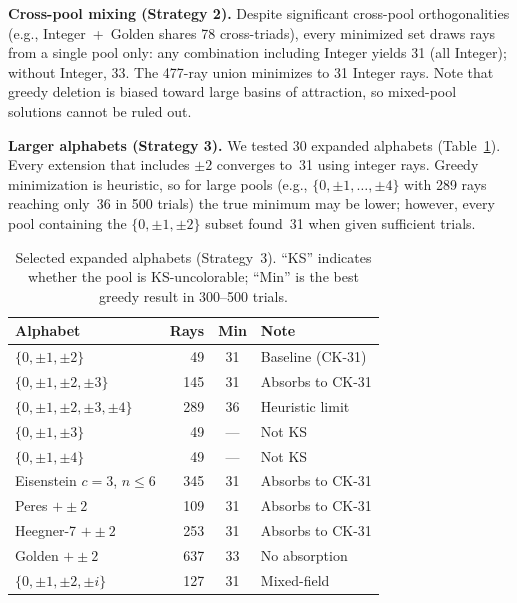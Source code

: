 \documentclass[twocolumn,prl,superscriptaddress,nofootinbib]{revtex4-2}
\begin{document}
\textbf{Cross-pool mixing (Strategy 2).} Despite significant cross-pool orthogonalities (e.g., Integer~+~Golden shares 78 cross-triads), every minimized set draws rays from a single pool only: any combination including Integer yields 31 (all Integer); without Integer, 33.  The 477-ray union minimizes to 31 Integer rays.  Note that greedy deletion is biased toward large basins of attraction, so mixed-pool solutions cannot be ruled out.

\textbf{Larger alphabets (Strategy 3).} We tested 30 expanded alphabets (Table~\ref{tab:expanded}). Every extension that includes $\pm2$ converges to~31 using integer rays. Greedy minimization is heuristic, so for large pools (e.g., $\{0,\pm1,\ldots,\pm4\}$ with 289 rays reaching only~36 in 500 trials) the true minimum may be lower; however, every pool containing the $\{0,\pm1,\pm2\}$ subset found~31 when given sufficient trials.

\begin{table}[t]
\centering
\caption{Selected expanded alphabets (Strategy~3). ``KS'' indicates whether the pool is KS-uncolorable; ``Min'' is the best greedy result in 300--500 trials.}
\label{tab:expanded}
\begin{tabular}{lrcl}
\toprule
Alphabet & Rays & Min & Note \\
\midrule
$\{0,\pm1,\pm2\}$ & 49 & 31 & Baseline (CK-31) \\
$\{0,\pm1,\pm2,\pm3\}$ & 145 & 31 & Absorbs to CK-31 \\
$\{0,\pm1,\pm2,\pm3,\pm4\}$ & 289 & 36 & Heuristic limit \\
$\{0,\pm1,\pm3\}$ & 49 & --- & Not KS \\
$\{0,\pm1,\pm4\}$ & 49 & --- & Not KS \\
Eisenstein $c{=}3$, $n{\leq}6$ & 345 & 31 & Absorbs to CK-31 \\
Peres $+ \pm2$ & 109 & 31 & Absorbs to CK-31 \\
Heegner-7 $+ \pm2$ & 253 & 31 & Absorbs to CK-31 \\
Golden $+ \pm2$ & 637 & 33 & No absorption \\
$\{0,\pm1,\pm2,\pm i\}$ & 127 & 31 & Mixed-field \\
\bottomrule
\end{tabular}
\end{table}
\end{document}
